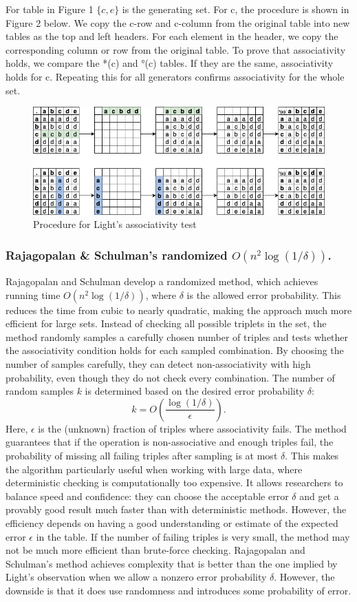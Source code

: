\documentclass[sigconf]{acmart}
\begin{document}
For table in Figure 1 \(\{c,e\}\) is the generating set. For c, the procedure is shown in Figure 2 below. We copy the c-row and c-column from the original table into new tables as the top and left headers. For each element in the header, we copy the corresponding column or row from the original table. To prove that associativity holds, we compare the *(c) and °(c) tables. If they are the same, associativity holds for c. Repeating this for all generators confirms associativity for the whole set.

\begin{figure}[H]
    \centering
    \includegraphics[width=0.5\linewidth]{Lights.png}
    \caption{Procedure for Light's associativity test}
\end{figure}

\subsubsection{Rajagopalan \& Schulman's randomized \( O(n^2 \log(1/\delta)) \).}
Rajagopalan and Schulman \cite{548520} develop a randomized method, which achieves running time $O(n^2 \log(1/\delta))$, where $\delta$ is the allowed error probability. This reduces the time from cubic to nearly quadratic, making the approach much more efficient for large sets.
Instead of checking all possible triplets in the set, the method randomly samples a carefully chosen number of triples and tests whether the associativity condition holds for each sampled combination. By choosing the number of samples carefully, they can detect non-associativity with high probability, even though they do not check every combination.
The number of random samples $k$ is determined based on the desired error probability $\delta$:
\[k = O\left(\frac{\log(1/\delta)}{\epsilon}\right).\]
Here, $\epsilon$ is the (unknown) fraction of triples where associativity fails. 
The method guarantees that if the operation is non-associative and enough triples fail, the probability of missing all failing triples after sampling is at most $\delta$. This makes the algorithm particularly useful when working with large data, where deterministic checking is computationally too expensive. It allows researchers to balance speed and confidence: they can choose the acceptable error $\delta$ and get a provably good result much faster than with deterministic methods.
However, the efficiency depends on having a good understanding or estimate of the expected error $\epsilon$ in the table. If the number of failing triples is very small, the method may not be much more efficient than brute-force checking.
Rajagopalan and Schulman’s method achieves complexity that is better than the one implied by Light’s observation when we allow a nonzero error probability $\delta$. However, the downside is that it does use randomness and introduces some probability of error.
    
\end{document}
